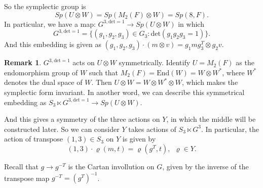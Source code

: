 \documentclass[12pt,a4paper,english]{article}
\theoremstyle{plain}
\theoremstyle{definition}
\newtheorem*{rem}{Remark}
\begin{document}
So the symplectic group is 
\begin{equation*}
    Sp(U\otimes W)=Sp(M_{2}(F)\otimes W)=Sp(8, F).
\end{equation*}
In particular, we have a map:
    $G^{3, \text{det}=1}\rightarrow Sp(U\otimes W)$
in which $$G^{3,\text{det}=1}=\{(g_{1},g_{2},g_{3})\in G_{3}:\text{det}(g_{1}g_{2}g_{3}=1)\}.$$
And this embedding is given as $(g_{1}, g_{2},g_{3})\cdot (m\otimes v)= g_{1}m
    g_{3}^{T}\otimes g_{2}v.$
\begin{rem}
$G^{3, \text{det}=1}$ acts on $U\otimes W$ symmetrically. Identify $U=M_{2}(F)$ as the endomorphism group of $W$ such that $M_{2}(F)=\text{End}(W)=W\otimes W^{*}$, where $W^{*}$ denotes the dual space of $W$. Then $U\otimes W=W\otimes W^{*}\otimes W$, which makes the symplectic form invariant. In another word, we can describe  this symmetrical embedding as 
$S_{3}\ltimes G^{3, \text{det}=1}\rightarrow Sp(U\otimes W)$.

And this gives a symmetry of the three actions on $Y$, in which the middle will be constructed later. So we can consider $Y$ takes actions of $S_{3}\ltimes G^{3}$. In particular, the action of transpose $(1,3)\in S_{3}$ on $Y$ is given by 
\begin{equation*}
    (1,3)\cdot \varrho(m,t)=\varrho(g^{T},t),\ \ \varrho\in Y.
\end{equation*}

Recall that $g\rightarrow g^{-T}$ is the Cartan invollution on $G$, given by the inverse of the transpose  map $g^{-T}=(g^{T})^{-1}$.
\end{rem}
\end{document}
